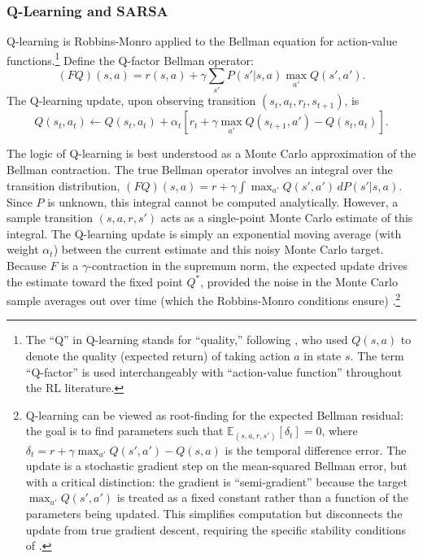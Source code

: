 \subsubsection{Q-Learning and SARSA}

Q-learning \citep{WatkinsDayan1992} is Robbins-Monro applied to the Bellman equation for action-value functions.\footnote{The ``Q'' in Q-learning stands for ``quality,'' following \citet{WatkinsDayan1992}, who used $Q(s,a)$ to denote the quality (expected return) of taking action $a$ in state $s$. The term ``Q-factor'' is used interchangeably with ``action-value function'' throughout the RL literature.} Define the Q-factor Bellman operator:
\begin{equation}
(FQ)(s,a) = r(s,a) + \gamma \sum_{s'} P(s'|s,a) \max_{a'} Q(s',a').
\end{equation}
The Q-learning update, upon observing transition $(s_t, a_t, r_t, s_{t+1})$, is
\begin{equation}
Q(s_t, a_t) \leftarrow Q(s_t, a_t) + \alpha_t \left[ r_t + \gamma \max_{a'} Q(s_{t+1}, a') - Q(s_t, a_t) \right].
\label{eq:qlearning}
\end{equation}

The logic of Q-learning is best understood as a Monte Carlo approximation of the Bellman contraction. The true Bellman operator involves an integral over the transition distribution, $(FQ)(s,a) = r + \gamma \int \max_{a'} Q(s',a') \, dP(s'|s,a)$. Since $P$ is unknown, this integral cannot be computed analytically. However, a sample transition $(s,a,r,s')$ acts as a single-point Monte Carlo estimate of this integral. The Q-learning update is simply an exponential moving average (with weight $\alpha_t$) between the current estimate and this noisy Monte Carlo target. Because $F$ is a $\gamma$-contraction in the supremum norm, the expected update drives the estimate toward the fixed point $Q^*$, provided the noise in the Monte Carlo sample averages out over time (which the Robbins-Monro conditions ensure) \citep{tsitsiklis1994}.\footnote{Q-learning can be viewed as root-finding for the expected Bellman residual: the goal is to find parameters such that $\mathbb{E}_{(s,a,r,s')}[\delta_t] = 0$, where $\delta_t = r + \gamma \max_{a'} Q(s',a') - Q(s,a)$ is the temporal difference error. The update is a stochastic gradient step on the mean-squared Bellman error, but with a critical distinction: the gradient is ``semi-gradient'' because the target $\max_{a'} Q(s',a')$ is treated as a fixed constant rather than a function of the parameters being updated. This simplifies computation but disconnects the update from true gradient descent, requiring the specific stability conditions of \citet{tsitsiklis1994}.}

